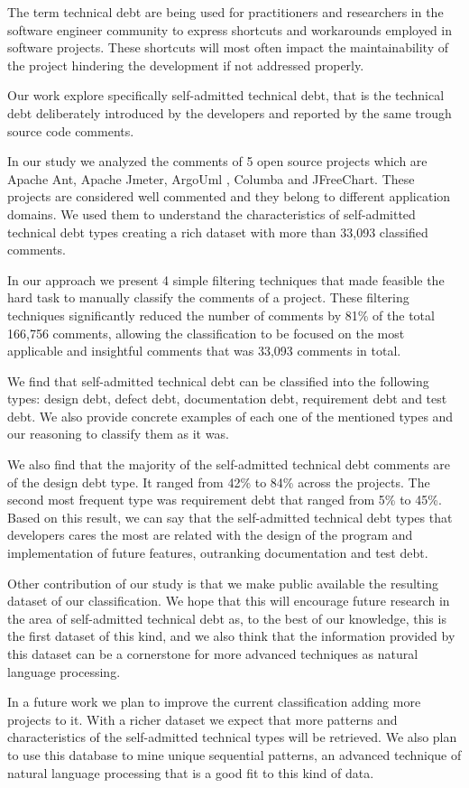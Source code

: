 The term technical debt are being used for practitioners and researchers in the software engineer community to express shortcuts and workarounds employed in software projects. These shortcuts will most often impact the maintainability of the project hindering the development if not addressed properly.

Our work explore specifically self-admitted technical debt, that is the technical debt deliberately introduced by the developers and reported by the same trough source code comments.

In our study we analyzed the comments of 5 open source projects which are Apache Ant, Apache Jmeter, ArgoUml , Columba and JFreeChart. These projects are considered well commented and they belong to different application domains. We used them to understand the characteristics of self-admitted technical debt types creating a rich dataset with more than 33,093 classified comments.

In our approach we present 4 simple filtering techniques that made feasible the hard task to manually classify the comments of a project. These filtering techniques significantly reduced the number of comments by 81\% of the total 166,756 comments, allowing the classification to be focused on the most applicable and insightful comments that was 33,093 comments in total. 

We find that self-admitted technical debt can be classified into the following types: design debt, defect debt, documentation debt, requirement debt and test debt. We also provide concrete examples of each one of the mentioned types and our reasoning to classify them as it was.  

We also find that the majority of the self-admitted technical debt comments are of the design debt type. It ranged from 42\% to 84\% across the projects. The second most frequent type was requirement debt that ranged from 5\% to 45\%. Based on this result, we can say that the self-admitted technical debt types that developers cares the most are related with the design of the program and implementation of future features, outranking documentation and test debt.

Other contribution of our study is that we make public available the resulting dataset of our classification. We hope that this will encourage future research in the area of self-admitted technical debt as, to the best of our knowledge, this is the first dataset of this kind, and we also think that the information provided by this dataset can be a cornerstone for more advanced techniques as natural language processing.   

In a future work we plan to improve the current classification adding more projects to it. With a richer dataset we expect that more patterns and characteristics of the self-admitted technical types will be retrieved. We also plan to use this database to mine unique sequential patterns, an advanced technique of natural language processing that is a good fit to this kind of data. 
